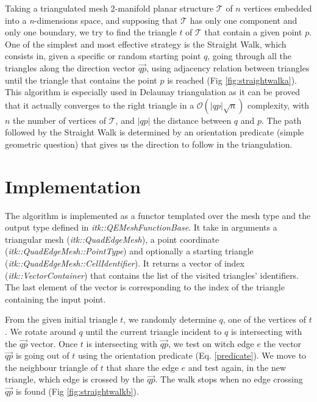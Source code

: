 \documentclass{InsightArticle}
\begin{document}
Taking a triangulated mesh 2-manifold planar structure $\mathcal{T}$ of $\mathit{n}$ vertices embedded into a \emph{n}-dimensions space, and supposing that $\mathcal{T}$ has only one component and only one boundary,  we try to find the triangle $\mathit{t}$ of $\mathcal{T}$ that contain a given point $\mathit{p}$. One of the simplest and most effective strategy is the Straight Walk, which consists in, given a specific or random starting point $\mathit{q}$, going through all the triangles along the direction vector $\overrightarrow{\mathit{qp}}$, using adjacency relation between triangles until the triangle that contains the point $\mathit{p}$ is reached (Fig \ref{fig:straightwalka}).
This algorithm is especially used in Delaunay triangulation as it can be proved that it actually converges to the right triangle in a $\mathcal{O}(\lvert \mathit{qp}\rvert \sqrt{\mathit{n}})$ complexity, with $\mathit{n}$ the number of vertices of $\mathcal{T}$, and $\lvert\mathit{qp}\rvert$ the distance between $\mathit{q}$ and $\mathit{p}$.
The path followed by the Straight Walk is determined by an orientation predicate (simple geometric question) that gives us the direction to follow in the triangulation.

\section{Implementation}

The algorithm is implemented as a functor templated over the mesh type and the output type defined in \emph{itk::QEMeshFunctionBase}. It take in arguments a triangular mesh (\emph{itk::QuadEdgeMesh}), a point coordinate (\emph{itk::QuadEdgeMesh::PointType}) and optionally a starting triangle (\emph{itk::QuadEdgeMesh::CellIdentifier}). It returns a vector of index (\emph{itk::VectorContainer}) that contains the list of the visited triangles' identifiers. The last element of the vector is corresponding to the index of the triangle containing the input point.

From the given initial triangle $\mathit{t}$, we randomly determine $\mathit{q}$, one of the vertices of $\mathit{t}$. We rotate around $\mathit{q}$ until the current triangle incident to $\mathit{q}$ is intersecting with the $\overrightarrow{\mathit{qp}}$ vector. Once $\mathit{t}$ is intersecting with $\overrightarrow{\mathit{qp}}$, we test on witch edge $\mathit{e}$ the vector $\overrightarrow{\mathit{qp}}$ is going out of $\mathit{t}$ using the orientation predicate (Eq. \ref{predicate}). We move to the neighbour triangle of $\mathit{t}$ that share the edge $\mathit{e}$ and test again, in the new triangle, which edge is crossed by the $\overrightarrow{\mathit{qp}}$. The walk stops when no edge crossing $\overrightarrow{\mathit{qp}}$ is found (Fig \ref{fig:straightwalkb}).
\end{document}
